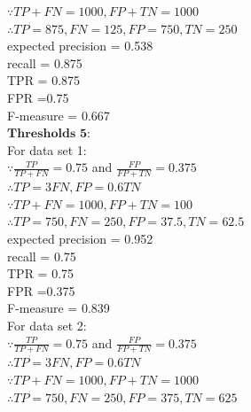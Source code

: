 \documentclass[12pt]{article}
\begin{document}
$\because TP + FN = 1000, FP + TN = 1000$\\

$\therefore TP = 875, FN = 125, FP = 750, TN = 250$\\

expected precision = 0.538\\

recall = 0.875\\

TPR = 0.875\\

FPR =0.75\\

F-measure = 0.667\\

$\textbf{Thresholds 5:}$ \\

For data set 1:\\

$\because \frac{TP}{TP+FN} = 0.75$ and $\frac{FP}{FP+TN} = 0.375$\\

$\therefore TP = 3FN, FP = 0.6TN$\\

$\because TP + FN = 1000, FP + TN = 100$\\

$\therefore TP = 750, FN = 250, FP = 37.5, TN = 62.5$\\

expected precision = 0.952\\

recall = 0.75\\

TPR = 0.75\\

FPR =0.375\\

F-measure = 0.839\\

For data set 2:\\

$\because \frac{TP}{TP+FN} = 0.75$ and $\frac{FP}{FP+TN} = 0.375$\\

$\therefore TP = 3FN, FP = 0.6TN$\\

$\because TP + FN = 1000, FP + TN = 1000$\\

$\therefore TP = 750, FN = 250, FP = 375, TN = 625$\\
\end{document}
